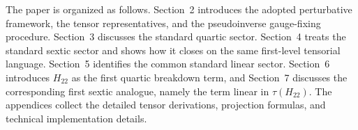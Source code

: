 \documentclass[journal=jacsat,manuscript=article]{achemso}
\begin{document}
The paper is organized as follows. Section~2 introduces the adopted
perturbative framework, the tensor representatives, and the
pseudoinverse gauge-fixing procedure. Section~3 discusses the
standard quartic sector. Section~4 treats the standard sextic sector
and shows how it closes on the same first-level tensorial language.
Section~5 identifies the common standard linear sector. Section~6
introduces $H_{22}$ as the first quartic breakdown term, and
Section~7 discusses the corresponding first sextic analogue, namely
the term linear in $\tau(H_{22})$. The appendices collect the
detailed tensor derivations, projection formulas, and technical
implementation details.


\end{document}
